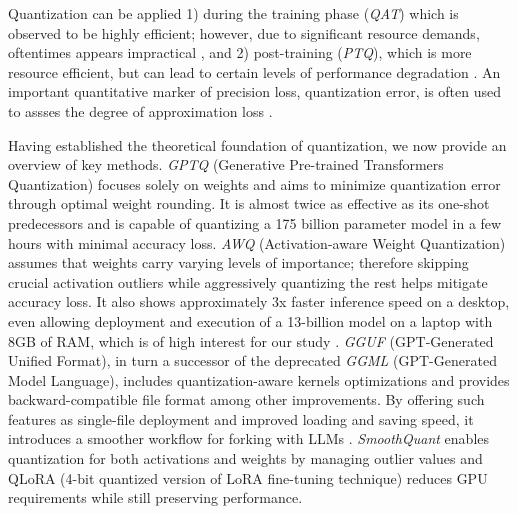 \documentclass[conference]{IEEEtran}
\begin{document}
Quantization can be applied 1) during the training phase (\textit{QAT}) which is observed to be highly efficient; however, due to significant resource demands, oftentimes appears impractical \cite{chen2024EfficientQAT}, and 2) post-training (\textit{PTQ}), which is more resource efficient, but can lead to certain levels of performance degradation \cite{shen2024exploring}. An important quantitative marker of precision loss, quantization error, is often used to assses the degree of approximation loss \cite{lin2024AWQ}.

Having established the theoretical foundation of quantization, we now provide an overview of key methods. \textit{GPTQ} (Generative Pre-trained Transformers Quantization) focuses solely on weights and aims to minimize quantization error through optimal weight rounding. It is almost twice as effective as its one-shot predecessors and is capable of quantizing a 175 billion parameter model in a few hours with minimal accuracy loss\cite{frantar2023GPTQ}. \textit{AWQ} (Activation-aware Weight Quantization) assumes that weights carry varying levels of importance; therefore skipping crucial activation outliers while aggressively quantizing the rest helps mitigate accuracy loss. It also shows approximately 3x faster inference speed on a desktop, even allowing deployment and execution of a 13-billion model on a laptop with 8GB of RAM, which is of high interest for our study \cite{lin2024AWQ}. \textit{GGUF} (GPT-Generated Unified Format), in turn a successor of the deprecated \textit{GGML} (GPT-Generated Model Language), includes  quantization-aware kernels optimizations and  provides backward-compatible file format among other improvements. By offering such features as single-file deployment and improved loading and saving speed, it introduces a smoother workflow for forking with LLMs \cite{rajput2024benchmarking}. \textit{SmoothQuant} \cite{xiao2023SmoothQuant} enables quantization for both activations and weights by managing outlier values and QLoRA (4-bit quantized version of LoRA fine-tuning technique) \cite{dettmers2023qlora} reduces GPU requirements while still preserving performance.

\end{document}
